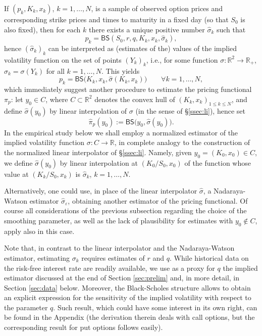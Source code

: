 \documentclass[11pt]{article}
\theoremstyle{remark}
\newcommand{\erre}{\mathbb{R}}
\begin{document}
If $(p_k,K_k,x_k)$, $k=1,\ldots,N$, is a sample of observed option
prices and corresponding strike prices and times to maturity in a
fixed day (so that $S_0$ is also fixed), then for each $k$ there exists
a unique positive number $\hat{\sigma}_k$ such that
\[
p_k = \mathsf{BS}(S_0,r,q,K_k,x_k,\hat{\sigma}_k),
\]
hence $(\hat{\sigma}_k)_k$ can be interpreted as (estimates of the)
values of the implied volatility function on the set of points
$(Y_k)_k$, i.e., for some function $\sigma:\erre^2 \to \erre_+$,
$\hat{\sigma}_k = \sigma(Y_k)$ for all $k=1,\ldots,N$. This
yields
\[
p_k = \mathsf{BS}\bigl(K_k,x_k,\hat{\sigma}(K_k,x_k)\bigr) 
\qquad \forall k=1,\ldots,N,
\]
which immediately suggest another procedure to estimate the pricing
functional $\pi_p$: let $y_0 \in C$, where $C \subset \erre^2$ denotes
the convex hull of $(K_k,x_k)_{1\leq k\leq N}$, and define
$\hat{\sigma}(y_0)$ by linear interpolation of $\sigma$ (in the sense
of {\S}\ref{ssec:li}), hence set
\[
\hat{\pi}_p(y_0):=\mathsf{BS}\bigl(y_0,\hat{\sigma}(y_0)\bigr).
\]
In the empirical study below we shall employ a normalized estimator of
the implied volatility function $\sigma:C \to \erre$, in complete
analogy to the construction of the normalized linear interpolator of
\S\ref{ssec:li}. Namely, given $y_0 = (K_0,x_0) \in C$, we define
$\hat{\sigma}(y_0)$ by linear interpolation at $(K_0/S_0,x_0)$ of the
function whose value at $(K_k/S_0,x_k)$ is $\hat{\sigma}_k$,
$k=1,\ldots,N$.

Alternatively, one could use, in place of the linear interpolator
$\hat{\sigma}$, a Nadaraya-Watson estimator
$\hat{\sigma}_\varepsilon$, obtaining another estimator of the pricing
functional. Of course all considerations of the previous subsection
regarding the choice of the smoothing parameter, as well as the lack
of plausibility for estimates with $y_0 \not\in C$, apply also in this
case.

Note that, in contrast to the linear interpolator and the
Nadaraya-Watson estimator, estimating $\sigma_k$ requires estimates of
$r$ and $q$. While historical data on the risk-free interest rate
are readily available, we use as a proxy for $q$ the implied estimator
discussed at the end of Section \ref{sec:prelim} and, in more detail,
in Section \ref{sec:data} below. Moreover, the Black-Scholes structure
allows to obtain an explicit expression for the sensitivity of the
implied volatility with respect to the parameter $q$. Such result,
which could have some interest in its own right, can be found in the
Appendix (the derivation therein deals with call options, but the
corresponding result for put options follows easily).
\end{document}
